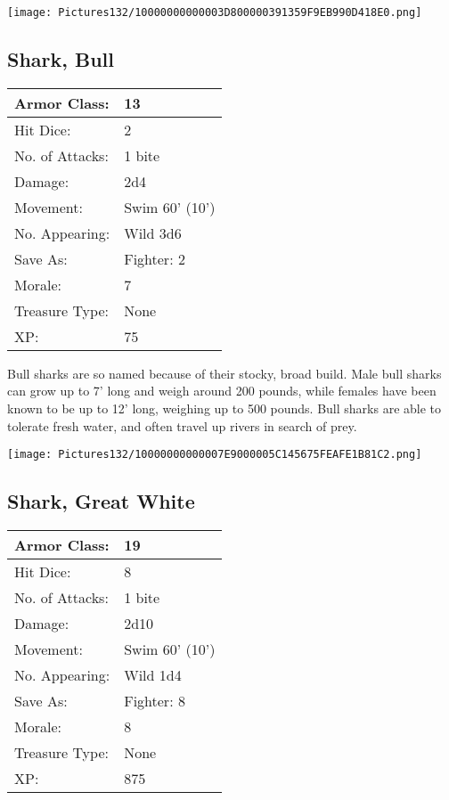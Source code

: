 \documentclass[a4paper,twoside,openany,10pt]{book}
\begin{document}
\begin{multicols}{2}
\begin{center} \texttt{[image: Pictures132/10000000000003D800000391359F9EB990D418E0.png]} \end{center}


\subsection*{Shark, Bull}\label{shark-bull}

\begin{tabularx}{0.50\textwidth}{@{}lX@{}}
Armor Class: & 13 \\\hline
Hit Dice: & 2 \\\hline
No. of Attacks: & 1 bite \\\hline
Damage: & 2d4 \\\hline
Movement: & Swim 60' (10') \\\hline
No. Appearing: & Wild 3d6 \\\hline
Save As: & Fighter: 2 \\\hline
Morale: & 7 \\\hline
Treasure Type: & None \\\hline
XP: & 75 \\\hline
\end{tabularx}\medskip

Bull sharks are so named because of their stocky, broad build. Male bull sharks can grow up to 7' long and weigh around 200 pounds, while females have been known to be up to 12' long, weighing up to 500 pounds. Bull sharks are able to tolerate fresh water, and often travel up rivers in search of prey.

\begin{center} \texttt{[image: Pictures132/10000000000007E9000005C145675FEAFE1B81C2.png]} \end{center}

\subsection*{Shark, Great White}\label{shark-great-white}

\begin{tabularx}{0.50\textwidth}{@{}lX@{}}
Armor Class: & 19 \\\hline
Hit Dice: & 8 \\\hline
No. of Attacks: & 1 bite \\\hline
Damage: & 2d10 \\\hline
Movement: & Swim 60' (10') \\\hline
No. Appearing: & Wild 1d4 \\\hline
Save As: & Fighter: 8 \\\hline
Morale: & 8 \\\hline
Treasure Type: & None \\\hline
XP: & 875 \\\hline
\end{tabularx}


\end{multicols}
\end{document}
